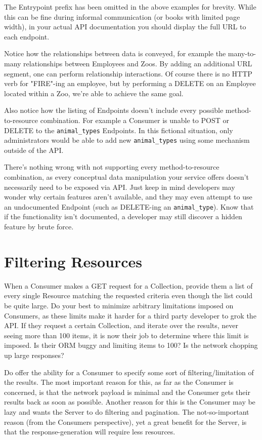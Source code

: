 \documentclass{book}
\begin{document}
The Entrypoint prefix has been omitted in the above examples for brevity. While this can be fine during informal communication (or books with limited page width), in your actual API documentation you should display the full URL to each endpoint.

Notice how the relationships between data is conveyed, for example the many-to-many relationships between Employees and Zoos. By adding an additional URL segment, one can perform relationship interactions. Of course there is no HTTP verb for "FIRE"-ing an employee, but by performing a DELETE on an Employee located within a Zoo, we're able to achieve the same goal.

Also notice how the listing of Endpoints doesn't include every possible method-to-resource combination. For example a Consumer is unable to POST or DELETE to the \texttt{animal\_types} Endpoints. In this fictional situation, only administrators would be able to add new \texttt{animal\_types} using some mechanism outside of the API.

There's nothing wrong with not supporting every method-to-resource combination, as every conceptual data manipulation your service offers doesn't necessarily need to be exposed via API. Just keep in mind developers may wonder why certain features aren't available, and they may even attempt to use an undocumented Endpoint (such as DELETE-ing an \texttt{animal\_type}). Know that if the functionality isn't documented, a developer may still discover a hidden feature by brute force.


\section{Filtering Resources}

When a Consumer makes a GET request for a Collection, provide them a list of every single Resource matching the requested criteria even though the list could be quite large. Do your best to minimize arbitrary limitations imposed on Consumers, as these limits make it harder for a third party developer to grok the API. If they request a certain Collection, and iterate over the results, never seeing more than 100 items, it is now their job to determine where this limit is imposed. Is their ORM buggy and limiting items to 100? Is the network chopping up large responses?

Do offer the ability for a Consumer to specify some sort of filtering/limitation of the results. The most important reason for this, as far as the Consumer is concerned, is that the network payload is minimal and the Consumer gets their results back as soon as possible. Another reason for this is the Consumer may be lazy and wants the Server to do filtering and pagination. The not-so-important reason (from the Consumers perspective), yet a great benefit for the Server, is that the response-generation will require less resources.
\end{document}
